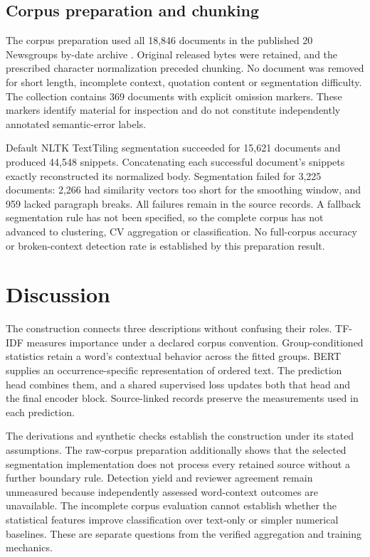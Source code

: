 \documentclass[10pt,letterpaper]{article}
\begin{document}
\subsection{Corpus preparation and chunking}
The corpus preparation used all 18,846 documents in the published 20 Newsgroups by-date archive \cite{twentynews}. Original released bytes were retained, and the prescribed character normalization preceded chunking. No document was removed for short length, incomplete context, quotation content or segmentation difficulty. The collection contains 369 documents with explicit omission markers. These markers identify material for inspection and do not constitute independently annotated semantic-error labels.\par

Default NLTK TextTiling segmentation succeeded for 15,621 documents and produced 44,548 snippets. Concatenating each successful document's snippets exactly reconstructed its normalized body. Segmentation failed for 3,225 documents: 2,266 had similarity vectors too short for the smoothing window, and 959 lacked paragraph breaks. All failures remain in the source records. A fallback segmentation rule has not been specified, so the complete corpus has not advanced to clustering, CV aggregation or classification. No full-corpus accuracy or broken-context detection rate is established by this preparation result.\par

\section{Discussion}
The construction connects three descriptions without confusing their roles. TF-IDF measures importance under a declared corpus convention. Group-conditioned statistics retain a word's contextual behavior across the fitted groups. BERT supplies an occurrence-specific representation of ordered text. The prediction head combines them, and a shared supervised loss updates both that head and the final encoder block. Source-linked records preserve the measurements used in each prediction.\par

The derivations and synthetic checks establish the construction under its stated assumptions. The raw-corpus preparation additionally shows that the selected segmentation implementation does not process every retained source without a further boundary rule. Detection yield and reviewer agreement remain unmeasured because independently assessed word-context outcomes are unavailable. The incomplete corpus evaluation cannot establish whether the statistical features improve classification over text-only or simpler numerical baselines. These are separate questions from the verified aggregation and training mechanics.\par
\end{document}
